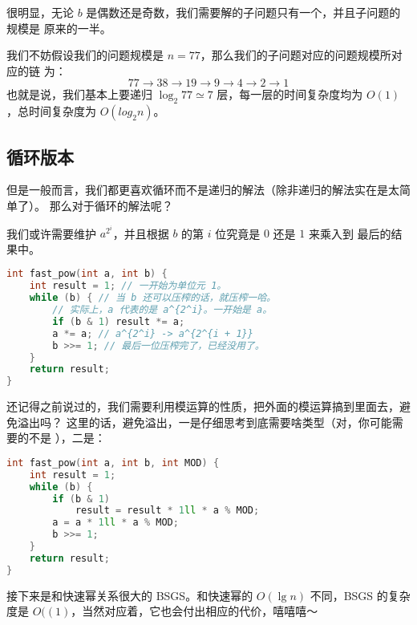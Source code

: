 \begin{frame}
很明显，无论 $b$ 是偶数还是奇数，我们需要解的子问题只有一个，并且子问题的规模是
原来的一半。\pause

我们不妨假设我们的问题规模是 $n = 77$，那么我们的子问题对应的问题规模所对应的链
为：\[
    77 \to 38 \to 19 \to 9 \to 4 \to 2 \to 1
\]也就是说，我们基本上要递归 $\log_2 77 \simeq 7$ 层，每一层的时间复杂度均为
$O(1)$，总时间复杂度为 $O(log_2 n)$。
\end{frame}

\subsection{循环版本}
\begin{frame}[fragile]
但是一般而言，我们都更喜欢循环而不是递归的解法（除非递归的解法实在是太简单了）。
那么对于循环的解法呢？

我们或许需要维护 $a^{2^i}$，并且根据 $b$ 的第 $i$ 位究竟是 $0$ 还是 $1$ 来乘入到
最后的结果中。

\begin{lstlisting}[language=C++]
int fast_pow(int a, int b) {
    int result = 1; // 一开始为单位元 1。
    while (b) { // 当 b 还可以压榨的话，就压榨一哈。
        // 实际上，a 代表的是 a^{2^i}。一开始是 a。
        if (b & 1) result *= a;
        a *= a; // a^{2^i} -> a^{2^{i + 1}}
        b >>= 1; // 最后一位压榨完了，已经没用了。
    }
    return result;
}
\end{lstlisting}
\end{frame}

\begin{frame}[fragile]
还记得之前说过的，我们需要利用模运算的性质，把外面的模运算搞到里面去，避免溢出吗？
这里的话，避免溢出，一是仔细思考到底需要啥类型（对，你可能需要的不是 ），二是：
\begin{lstlisting}[language=C++]
int fast_pow(int a, int b, int MOD) {
    int result = 1;
    while (b) {
        if (b & 1)
            result = result * 1ll * a % MOD;
        a = a * 1ll * a % MOD;
        b >>= 1;
    }
    return result;
}
\end{lstlisting}
\end{frame}

\begin{frame}
接下来是和快速幂关系很大的 BSGS。和快速幂的 $O(\lg n)$ 不同，BSGS 的复杂度是
$O((1)$，当然对应着，它也会付出相应的代价，嘻嘻嘻～
\end{frame}
